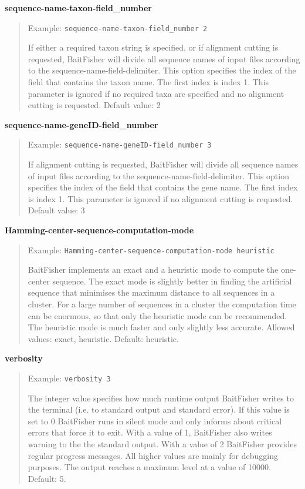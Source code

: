 \documentclass[a4paper,pdflatex,11pt]{article}
\begin{document}
\textbf{sequence-name-taxon-field\_number}

\begin{quote}
Example: \verb+sequence-name-taxon-field_number 2+

If either a required taxon string is specified, or if alignment cutting
is requested, BaitFisher will divide all sequence names of input files
according to the sequence-name-field-delimiter. This option specifies
the index of the field that contains the taxon name. The first index is
index 1. This parameter is ignored if no required taxa are specified and
no alignment cutting is requested. Default value: 2
\end{quote}

\textbf{sequence-name-geneID-field\_number}

\begin{quote}
Example: \verb+sequence-name-geneID-field_number 3+

If alignment cutting is requested, BaitFisher will divide all sequence
names of input files according to the sequence-name-field-delimiter.
This option specifies the index of the field that contains the gene
name. The first index is index 1. This parameter is ignored if no
alignment cutting is requested. Default value: 3
\end{quote}

\textbf{Hamming-center-sequence-computation-mode}

\begin{quote}
Example: \verb+Hamming-center-sequence-computation-mode heuristic+

BaitFisher implements an exact and a heuristic mode to compute the
one-center sequence. The exact mode is slightly better in finding the
artificial sequence that minimises the maximum distance to all sequences
in a cluster. For a large number of sequences in a cluster the
computation time can be enormous, so that only the heuristic mode can be
recommended. The heuristic mode is much faster and only slightly less
accurate. Allowed values: exact, heuristic. Default: heuristic.
\end{quote}

\textbf{verbosity}

\begin{quote}
Example: \verb+verbosity 3+

The integer value specifies how much runtime output BaitFisher writes to
the terminal (i.e. to standard output and standard error). If this value
is set to 0 BaitFisher runs in silent mode and only informs about
critical errors that force it to exit. With a value of 1, BaitFisher
also writes warning to the the standard output. With a value of 2
BaitFisher provides regular progress messages. All higher values are
mainly for debugging purposes. The output reaches a maximum level at a
value of 10000. Default: 5.
\end{quote}
\end{document}
